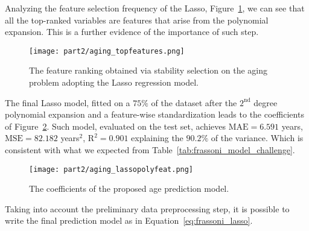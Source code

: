 Analyzing the feature selection frequency of the Lasso, Figure~\ref{fig:frassoni_topfeat}, we can see that all the top-ranked variables are features that arise from the polynomial expansion. This is a further evidence of the importance of such step.

\begin{figure}[]
	\centering
	\texttt{[image: part2/aging\_topfeatures.png]}
	\caption{The feature ranking obtained via stability selection on the aging problem adopting the Lasso regression model.} \label{fig:frassoni_topfeat}
\end{figure}

The final Lasso model, fitted on a $75\%$ of the dataset after the $2^{\text{nd}}$ degree polynomial expansion and a feature-wise standardization leads to the coefficients of Figure~\ref{fig:frassoni_topmodel}. Such model, evaluated on the test set, achieves $\text{MAE}=6.591$ years, $\text{MSE} = 82.182$ years$^2$, $\text{R}^2 = 0.901$ explaining the $90.2\%$ of the variance. Which is consistent with what we expected from Table~\ref{tab:frassoni_model_challenge}.

\begin{figure}[]
	\centering
	\texttt{[image: part2/aging\_lassopolyfeat.png]}
	\caption{The coefficients of the proposed age prediction model.} \label{fig:frassoni_topmodel}
\end{figure}

Taking into account the preliminary data preprocessing step, it is possible to write the final prediction model as in Equation~\eqref{eq:frassoni_lasso}.

